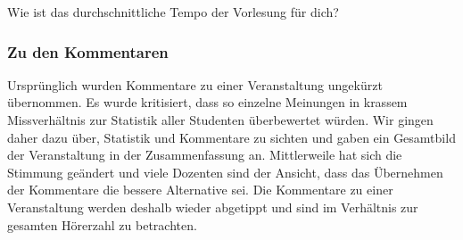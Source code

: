    \parbox[t]{8.3cm}{\raggedright Wie ist das durchschnittliche Tempo der Vorlesung für dich?}
   \hspace{0.3cm}\rule[-1cm]{0mm}{1cm}

\subsubsection{Zu den Kommentaren}

Ursprünglich wurden Kommentare zu einer Veranstaltung ungekürzt übernommen. Es wurde kritisiert, dass so einzelne Meinungen in krassem Missverhältnis zur Statistik aller 
Studenten überbewertet würden. Wir gingen daher dazu über, Statistik und Kommentare zu sichten und gaben ein Gesamtbild der Veranstaltung in der Zusammenfassung an.
Mittlerweile hat sich die Stimmung geändert und viele Dozenten sind der Ansicht, dass das Übernehmen der Kommentare die bessere Alternative sei. Die Kommentare zu einer
Veranstaltung werden deshalb wieder abgetippt und sind im Verhältnis zur gesamten Hörerzahl zu betrachten.


